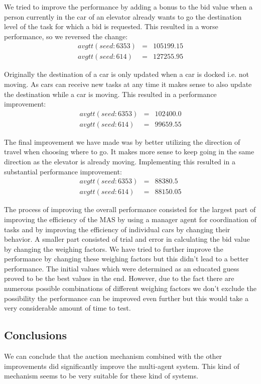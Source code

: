 \documentclass[a4paper,11pt]{article}
\begin{document}
We tried to improve the performance by adding a bonus to the bid value when a person currently in the car of an elevator already wants to go the destination level of the task for which a bid is requested. This resulted in a worse performance, so we reversed the change:
\[\begin{array}{lcl}
avgtt (seed: 6353) & = & 105199.15\\
avgtt (seed: 614) & = & 127255.95
\end{array}\]

Originally the destination of a car is only updated when a car is docked i.e. not moving. As cars can receive new tasks at any time it makes sense to also update the destination while a car is moving. This resulted in a performance improvement: 
\[\begin{array}{lcl}
avgtt (seed: 6353) & = & 102400.0\\
avgtt (seed: 614) & = & 99659.55
\end{array}\]

The final improvement we have made was by better utilizing the direction of travel when choosing where to go. It makes more sense to keep going in the same direction as the elevator is already moving. Implementing this resulted in a substantial performance improvement:
\[\begin{array}{lcl}
avgtt (seed: 6353) & = & 88380.5\\
avgtt (seed: 614) & = & 88150.05
\end{array}\]

The process of improving the overall performance consisted for the largest part of improving the efficiency of the MAS by using a manager agent for coordination of tasks and by improving the efficiency of individual cars by changing their behavior. A smaller part consisted of trial and error in calculating the bid value by changing the weighing factors. We have tried to further improve the performance by changing these weighing factors but this didn't lead to a better performance. The initial values which were determined as an educated guess proved to be the best values in the end. However, due to the fact there are numerous possible combinations of different weighing factors we don't exclude the possibility the performance can be improved even further but this would take a very considerable amount of time to test. 

\subsection{Conclusions}
We can conclude that the auction mechanism combined with the other improvements did significantly improve the multi-agent system. This kind of mechanism seems to be very suitable for these kind of systems.
\end{document}
